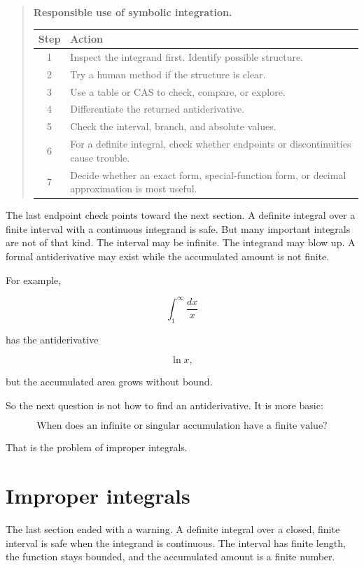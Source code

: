 \begin{quote}
\textbf{Responsible use of symbolic integration.}

\begin{center}
\begin{tabular}{c|p{}}
\textbf{Step} & \textbf{Action} \\ \hline
1 & Inspect the integrand first.  Identify possible structure. \\[4pt]
2 & Try a human method if the structure is clear. \\[4pt]
3 & Use a table or CAS to check, compare, or explore. \\[4pt]
4 & Differentiate the returned antiderivative. \\[4pt]
5 & Check the interval, branch, and absolute values. \\[4pt]
6 & For a definite integral, check whether endpoints or discontinuities cause trouble. \\[4pt]
7 & Decide whether an exact form, special-function form, or decimal approximation is most useful.
\end{tabular}
\end{center}
\end{quote}

The last endpoint check points toward the next section.  A definite integral over a finite
interval with a continuous integrand is safe.  But many important integrals are not of that
kind.  The interval may be infinite.  The integrand may blow up.  A formal antiderivative
may exist while the accumulated amount is not finite.

For example,

\[
\int_1^\infty \frac{dx}{x}
\]

has the antiderivative

\[
\ln x,
\]

but the accumulated area grows without bound.

So the next question is not how to find an antiderivative.  It is more basic:

\[
\boxed{
\text{When does an infinite or singular accumulation have a finite value?}
}
\]

That is the problem of improper integrals.\Computing
\section{Improper integrals}
\label{sec:improper-integrals}

The last section ended with a warning.  A definite integral over a closed, finite interval is
safe when the integrand is continuous.  The interval has finite length, the function stays
bounded, and the accumulated amount is a finite number.

